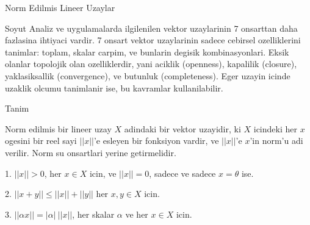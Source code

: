 \documentclass[12pt,fleqn]{article}
\begin{document}
Norm Edilmis Lineer Uzaylar

Soyut Analiz ve uygulamalarda ilgilenilen vektor uzaylarinin 7 onsarttan
daha fazlasina ihtiyaci vardir. 7 onsart vektor uzaylarinin sadece cebirsel
ozelliklerini tanimlar: toplam, skalar carpim, ve bunlarin degisik
kombinasyonlari. Eksik olanlar topolojik olan ozelliklerdir, yani aciklik
(openness), kapalilik (closure), yaklasiksallik (convergence), ve butunluk
(completeness). Eger uzayin icinde uzaklik olcumu tanimlanir ise, bu
kavramlar kullanilabilir. 

Tanim

Norm edilmis bir lineer uzay $X$ adindaki bir vektor uzayidir, ki $X$
icindeki her $x$ ogesini bir reel sayi $||x||$'e esleyen bir fonksiyon
vardir, ve $||x||$'e $x$'in norm'u adi verilir. Norm su onsartlari yerine
getirmelidir. 

1. $||x|| > 0$, her $x \in X$ icin, ve $||x|| = 0$, sadece ve sadece $x =
\theta$ ise. 

2. $||x+y|| \le ||x|| + ||y||$ her $x,y \in X$ icin. 

3. $||\alpha x|| = |\alpha| \ ||x||$, her skalar $\alpha$ ve her $x \in X$
icin. 
\end{document}
